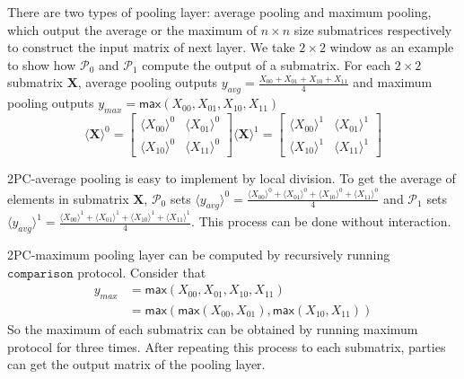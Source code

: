 \documentclass[letterpaper]{article} %
\begin{document}
    There are two types of pooling layer: average pooling and maximum pooling,
    which output the average or the maximum of $n\times n$ size submatrices respectively
    to construct the input matrix of next layer.
    We take $2\times 2$ window as an example to show how $\mathcal{P}_{0}$ and $\mathcal{P}_{1}$ compute the output of a submatrix.
    For each $2\times 2$ submatrix $\mathbf{X}$, average pooling outputs $y_{avg}=\frac{X_{00}+ X_{01}+ X_{10}+  X_{11}}{4}$
    and maximum pooling outputs $y_{max}=\mathsf{max}(X_{00}, X_{01}, X_{10},  X_{11})$
    $$  \langle \mathbf{X}\rangle ^{0}= \begin{bmatrix}
        \langle X_{00}\rangle ^{0}& \langle X_{01}\rangle ^{0} \\
        \langle X_{10}\rangle ^{0}& \langle X_{11}\rangle ^{0}
       \end{bmatrix}\langle \mathbf{X}\rangle ^{1}=\begin{bmatrix}
        \langle X_{00}\rangle ^{1}& \langle X_{01}\rangle ^{1} \\
        \langle X_{10}\rangle ^{1}& \langle X_{11}\rangle ^{1}
       \end{bmatrix}$$

    2PC-average pooling is easy to implement by local division.
    To get the average of elements in submatrix $\mathbf{X}$,
    $\mathcal{P}_{0}$ sets $\langle y_{avg}\rangle^{0} = \frac{\langle X_{00}\rangle ^{0}+ \langle X_{01}\rangle ^{0}+
    \langle X_{10}\rangle ^{0}+ \langle X_{11}\rangle ^{0}}{4}$ and
    $\mathcal{P}_{1}$ sets $\langle y_{avg}\rangle^{1} = \frac{\langle X_{00}\rangle ^{1}+ \langle X_{01}\rangle ^{1}+
    \langle X_{10}\rangle ^{1}+ \langle X_{11}\rangle ^{1}}{4}$. This process can be done without interaction.

    2PC-maximum pooling layer can be computed by recursively running $\mathtt{comparison}$ protocol.
    Consider that
    \begin{align*}
        y_{max} &= \mathsf{max}(X_{00}, X_{01}, X_{10}, X_{11}) \\
        &= \mathsf{max}(\mathsf{max}(X_{00},X_{01}),\mathsf{max}( X_{10}, X_{11}))
    \end{align*}
    So the maximum of each submatrix can be obtained by running
    maximum protocol for three times.
    After repeating this process to each submatrix, parties can get the output matrix of the pooling layer.
\end{document}
